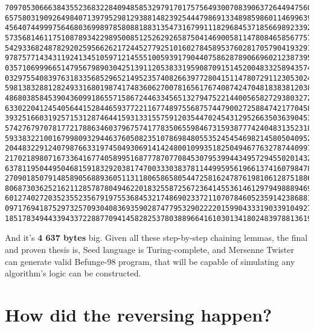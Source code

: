 \documentclass{article}
\begin{document}
\begin{verbatim}
70970530666384355236832284094858532979170175756493007083906372644947560502353750754104302433701
65758031909264984071397952981293881482392544479869133489859860114699639566779561617089469101905
45640744999756468036998978580881883135473167991118296845371856698923392214856776751663948265388
57356814611751087893422989500851252629265875041469005811478084658567757370493665254592190823074
54293368248782920259566262172445277925101602784589537602817057904193291948162808009562970003232
97875771434311924134510597121455510059391790440758628789066960212387395064111224439766822746245
03571069996651479567989030425139112053833195908709151452004833258943574098970080890242640710070
03297554083976318335685296521495235740826639772804151147807291123053024424790764106918806154830
59813832881282493316801987417483606270078165617674087424704818383812038932876146621124234091723
48680385845390436099186557158672446334565132794752214400565827293803272736638564580506051589204
63302204124540564415284465937722116774897556875744790027258847421770458552441054345596429041830
39325166031925715312874644159313315575912035447024543129526635036390453041711773525436959715026
57427679707817721788634603796757417783506559846731593877742404831352318677733816759718954567808
59338322100167998093294463760508235107869848055352454546982145805040952393877630209528468131126
20448322912407987663319745049306914142480010993518250494677632787440997943848186189775327144000
21702189807167336416774058995168777870770845307953994434957294550201432709796418079546060877975
63781195044950468159183292038174700333038378114499595619661374160798478505826254462728123747300
27090185079148589056889360511311806586580544725816247876198106128751886998044325406570156688712
80687303625216211285787804946220183255872567236414553614612979498889469153759765356621415952951
60127402720352355235679197553684532174869023372110707846052359142386881950279879397712445766312
09717694187529732570930408369359028747795329022220159904333190339104927908533379343350600156136
18517834944339433722887709414582825378038896641610301341802483978813619717734
\end{verbatim}

And it's \textbf{4 637 bytes} big. Given all these step-by-step chaining lemmas, the final and proven thesis is, Seed language is Turing-complete, and Mersenne Twister can generate valid Befunge-98 program, that will be capable of simulating any algorithm's logic can be constructed.

\section{How did the reversing happen?}
\end{document}
